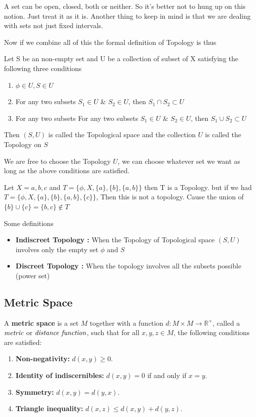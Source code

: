 \documentclass{article}
\begin{document}
A set can be open, closed, both or neither. So it's better not to hung up on this notion. Just treat it as it is. Another thing to keep in mind is that we are dealing with sets not just fixed intervals. 

Now if we combine all of this the formal definition of Topology is thus 

\begin{theorem}
    Let S be an non-empty set and U be a collection of subset of X satisfying the following three conditions 
    \begin{enumerate}
        \item $ \phi \in U, S \in U $ 
        \item For any two subsets $ S_1 \in U $ \& $ S_2 \in U $, then $ S_1 \cap S_2 \subset U $ 
        \item For any two subsets For any two subsets $ S_1 \in U $ \& $ S_2 \in U $, then $ S_1 \cup S_2 \subset U $ 
    \end{enumerate} 
    Then $ (S,U) $ is called the Topological space and the collection $ U $ is called the Topology on $ S $ 
\end{theorem}

We are free to choose the Topology $ U $, we can choose whatever set we want as long as the above conditions are satisfied. 

\begin{proposition}
    Let $ X = {a,b,c} $ and $ T = \{ \phi, X, \{a\}, \{b\}, \{a,b\} \} $ then T is a Topology. but if we had $ T = \{ \phi, X, \{a\}, \{b\}, \{a,b\} , \{c\} \} $, Then this is not a topology. 
    Cause the union of $ \{b\} \cup \{c\} = \{b,c\} \notin T $ 
\end{proposition}

Some definitions 

\begin{itemize}
    \item \textbf{Indiscreet Topology :} When the Topology of Topological space $(S,U)$ involves only the empty set $\phi$ and $S$ 
    \item \textbf{Discreet Topology :} When the topology involves all the subsets possible 
        (power set) 
\end{itemize}

\subsection{Metric Space}
A \textbf{metric space} is a set $M$ together with a function $d: M \times M \to \mathbb{R}^{+}$, called a $\emph{metric}$ or $\emph{distance function}$, such that for all $x, y, z \in M$, the following conditions are satisfied:
\begin{enumerate}
    \item \textbf{Non-negativity:} $d(x, y) \geq 0$.
    \item \textbf{Identity of indiscernibles:} $d(x, y) = 0$ if and only if $x = y$.
    \item \textbf{Symmetry:} $d(x, y) = d(y, x)$.
    \item \textbf{Triangle inequality:} $d(x, z) \leq d(x, y) + d(y, z)$.
\end{enumerate}
\end{document}
